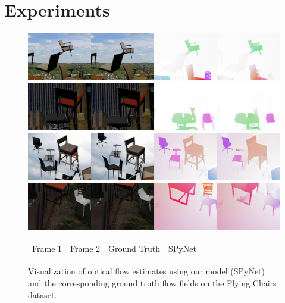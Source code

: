 \documentclass[10pt,twocolumn,letterpaper]{article}
\begin{document}
\section{Experiments}
\begin{figure}[t]
\begin{center}
\includegraphics[width=\linewidth]{01119_viz.png}
\includegraphics[width=\linewidth]{01519_viz.png}
\includegraphics[width=\linewidth]{03273_viz.png}
\includegraphics[width=\linewidth]{08658_viz.png}
\begin{tabular}{C{0.08\textwidth}C{0.09\textwidth}C{0.14\textwidth}C{0.07\textwidth}}
Frame 1 & Frame 2 & Ground Truth & SPyNet \\
 \end{tabular}
\end{center}
\vspace{-0.1in}
   \caption{Visualization of optical flow estimates using our model (SPyNet) and the corresponding ground truth flow fields on the Flying Chairs dataset.}
\label{fig:chairsresults}
\end{figure}
\end{document}
